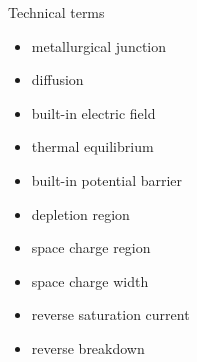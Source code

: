 %
\begin{frame}[label=pre-M2T1-slot2]{Technical terms}
	\begin{itemize}
		\item metallurgical junction
		\item diffusion
		\item built-in electric field
		\item thermal equilibrium
		\item built-in potential barrier
		\item depletion region
		\item space charge region
		\item space charge width
		\item reverse saturation current
		\item reverse breakdown
	\end{itemize}
\end{frame}
%